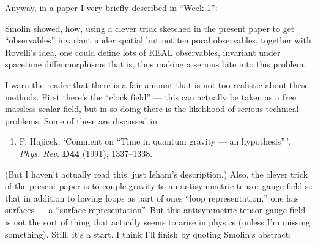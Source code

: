 \documentclass{article}
\def\tightlist{}
\renewcommand{\texttt}[1]{%
  \begingroup
  \ttfamily
  \begingroup\lccode`~=`/\lowercase{\endgroup\def~}{/\discretionary{}{}{}}%
  \begingroup\lccode`~=`[\lowercase{\endgroup\def~}{[\discretionary{}{}{}}%
  \begingroup\lccode`~=`.\lowercase{\endgroup\def~}{.\discretionary{}{}{}}%
  \catcode`/=\active\catcode`[=\active\catcode`.=\active
  \scantokens{#1\noexpand}%
  \endgroup
}
\begin{document}
Anyway, in a paper I very briefly described in
\protect\hyperlink{week1}{``Week 1''}:


Smolin showed, how, using a clever trick sketched in the present paper
to get ``observables'' invariant under spatial but not temporal
observables, together with Rovelli's idea, one could define lots of REAL
observables, invariant under spacetime diffeomorphisms that is, thus
making a serious bite into this problem.

I warn the reader that there is a fair amount that is not too realistic
about these methods. First there's the ``clock field'' --- this can
actually be taken as a free massless scalar field, but in so doing there
is the likelihood of serious technical problems. Some of these are
discussed in

\begin{enumerate}
\def\labelenumi{\arabic{enumi})}
\setcounter{enumi}{5}
\tightlist
\item
  P. Hajicek, `Comment on ``Time in quantum gravity --- an
  hypothesis''\,', \emph{Phys. Rev.} \textbf{D44} (1991), 1337--1338.
\end{enumerate}

(But I haven't actually read this, just Isham's description.) Also, the
clever trick of the present paper is to couple gravity to an
antisymmetric tensor gauge field so that in addition to having loops as
part of ones ``loop representation,'' one has surfaces --- a ``surface
representation''. But this antisymmetric tensor gauge field is not the
sort of thing that actually seems to arise in physics (unless I'm
missing something). Still, it's a start. I think I'll finish by quoting
Smolin's abstract:
\end{document}
